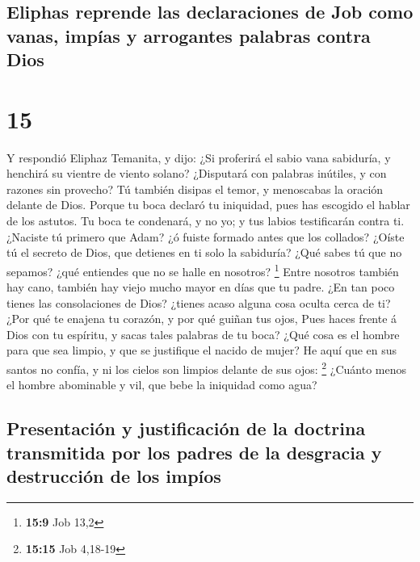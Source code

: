 \hypertarget{eliphas-reprende-las-declaraciones-de-job-como-vanas-impuxedas-y-arrogantes-palabras-contra-dios}{%
\subsection{Eliphas reprende las declaraciones de Job como vanas, impías
y arrogantes palabras contra
Dios}\label{eliphas-reprende-las-declaraciones-de-job-como-vanas-impuxedas-y-arrogantes-palabras-contra-dios}}

\hypertarget{section-14}{%
\section{15}\label{section-14}}

 Y respondió Eliphaz Temanita, y dijo:  ¿Si
proferirá el sabio vana sabiduría, y henchirá su vientre de viento
solano?  ¿Disputará con palabras inútiles, y con razones sin
provecho?  Tú también disipas el temor, y menoscabas la
oración delante de Dios.  Porque tu boca declaró tu
iniquidad, pues has escogido el hablar de los astutos.  Tu
boca te condenará, y no yo; y tus labios testificarán contra ti.
 ¿Naciste tú primero que Adam? ¿ó fuiste formado antes que
los collados?  ¿Oíste tú el secreto de Dios, que detienes en
ti solo la sabiduría?  ¿Qué sabes tú que no sepamos? ¿qué
entiendes que no se halle en nosotros? \footnote{\textbf{15:9} Job 13,2}
 Entre nosotros también hay cano, también hay viejo mucho
mayor en días que tu padre.  ¿En tan poco tienes las
consolaciones de Dios? ¿tienes acaso alguna cosa oculta cerca de ti?
 ¿Por qué te enajena tu corazón, y por qué guiñan tus ojos,
 Pues haces frente á Dios con tu espíritu, y sacas tales
palabras de tu boca?  ¿Qué cosa es el hombre para que sea
limpio, y que se justifique el nacido de mujer?  He aquí
que en sus santos no confía, y ni los cielos son limpios delante de sus
ojos: \footnote{\textbf{15:15} Job 4,18-19}  ¿Cuánto menos
el hombre abominable y vil, que bebe la iniquidad como agua?

\hypertarget{presentaciuxf3n-y-justificaciuxf3n-de-la-doctrina-transmitida-por-los-padres-de-la-desgracia-y-destrucciuxf3n-de-los-impuxedos}{%
\subsection{Presentación y justificación de la doctrina transmitida por
los padres de la desgracia y destrucción de los
impíos}\label{presentaciuxf3n-y-justificaciuxf3n-de-la-doctrina-transmitida-por-los-padres-de-la-desgracia-y-destrucciuxf3n-de-los-impuxedos}}

